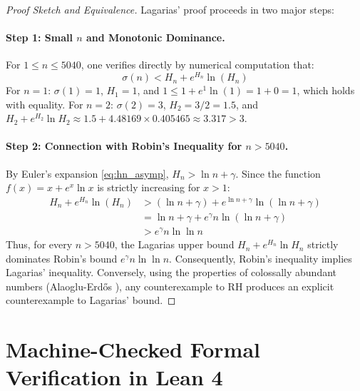 \documentclass[11pt,a4paper]{article}
\theoremstyle{definition}
\begin{document}
\begin{proof}[Proof Sketch and Equivalence]
Lagarias' proof proceeds in two major steps:
\paragraph{Step 1: Small $n$ and Monotonic Dominance.}
For $1 \le n \le 5040$, one verifies directly by numerical computation that:
\[ \sigma(n) < H_n + e^{H_n} \ln(H_n) \]
For $n = 1$: $\sigma(1) = 1$, $H_1 = 1$, and $1 \le 1 + e^1 \ln(1) = 1 + 0 = 1$, which holds with equality.
For $n = 2$: $\sigma(2) = 3$, $H_2 = 3/2 = 1.5$, and $H_2 + e^{H_2} \ln H_2 \approx 1.5 + 4.48169 \times 0.405465 \approx 3.317 > 3$.

\paragraph{Step 2: Connection with Robin's Inequality for $n > 5040$.}
By Euler's expansion \eqref{eq:hn_asymp}, $H_n > \ln n + \gamma$.
Since the function $f(x) = x + e^x \ln x$ is strictly increasing for $x > 1$:
\begin{align*}
H_n + e^{H_n} \ln(H_n) &> (\ln n + \gamma) + e^{\ln n + \gamma} \ln(\ln n + \gamma) \\
&= \ln n + \gamma + e^\gamma n \ln(\ln n + \gamma) \\
&> e^\gamma n \ln\ln n
\end{align*}
Thus, for every $n > 5040$, the Lagarias upper bound $H_n + e^{H_n} \ln H_n$ strictly dominates Robin's bound $e^\gamma n \ln\ln n$.
Consequently, Robin's inequality implies Lagarias' inequality.
Conversely, using the properties of colossally abundant numbers (Alaoglu-Erd\H{o}s \cite{alaoglu1944}), any counterexample to RH produces an explicit counterexample to Lagarias' bound.
\end{proof}

\section{Machine-Checked Formal Verification in Lean 4}
\end{document}

